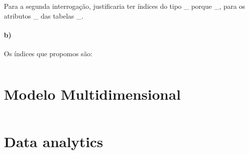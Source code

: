 \documentclass[10pt,a4paper]{article}
\begin{document}
Para a segunda interrogação, justificaria ter índices do tipo \_ porque \_, para os atributos \_ das tabelas \_.
\paragraph{b)}
Os índices que propomos são:
\begin{verbatim}
\end{verbatim}

\section{Modelo Multidimensional}
\begin{verbatim}
\end{verbatim}


\section{Data analytics}
\begin{verbatim}
\end{verbatim}
\end{document}
